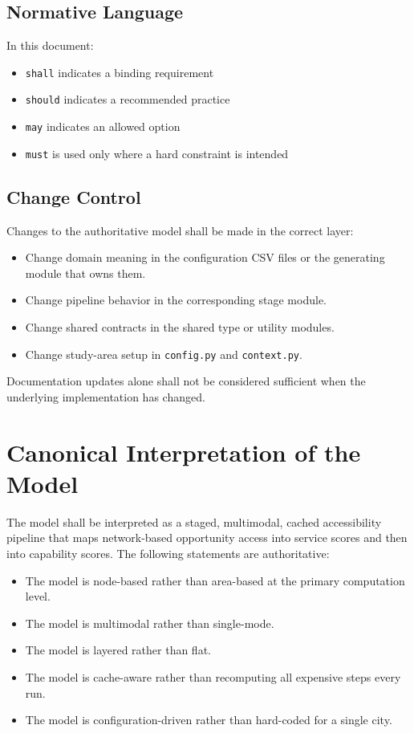 \documentclass[11pt]{article}
\begin{document}
\subsection*{Normative Language}

In this document:

\begin{itemize}
  \item \texttt{shall} indicates a binding requirement
  \item \texttt{should} indicates a recommended practice
  \item \texttt{may} indicates an allowed option
  \item \texttt{must} is used only where a hard constraint is intended
\end{itemize}

\subsection*{Change Control}

Changes to the authoritative model shall be made in the correct layer:

\begin{itemize}
  \item Change domain meaning in the configuration CSV files or the generating module that owns them.
  \item Change pipeline behavior in the corresponding stage module.
  \item Change shared contracts in the shared type or utility modules.
  \item Change study-area setup in \texttt{config.py} and \texttt{context.py}.
\end{itemize}

Documentation updates alone shall not be considered sufficient when the underlying implementation has changed.

\section*{Canonical Interpretation of the Model}

The model shall be interpreted as a staged, multimodal, cached accessibility pipeline that maps network-based opportunity access into service scores and then into capability scores. The following statements are authoritative:

\begin{itemize}
  \item The model is node-based rather than area-based at the primary computation level.
  \item The model is multimodal rather than single-mode.
  \item The model is layered rather than flat.
  \item The model is cache-aware rather than recomputing all expensive steps every run.
  \item The model is configuration-driven rather than hard-coded for a single city.
\end{itemize}
\end{document}
